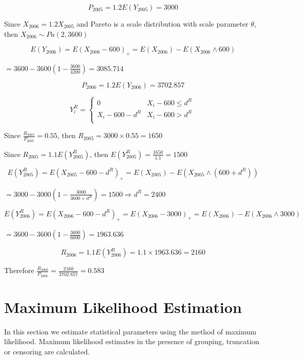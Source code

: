 \documentclass[]{book}
\begin{document}
\[P_{2005} = 1.2E\left( Y_{2005} \right) = 3000\]

Since \(X_{2006} = 1.2X_{2005}\) and Pareto is a scale distribution with
scale parameter \(\theta\), then
\(X_{2006}\sim Pa\left( 2,3600 \right)\)

\[E\left( Y_{2006} \right) = E\left( X_{2006} - 600 \right)_{+} = E\left( X_{2006} \right) - E\left( X_{2006} \land 600 \right)\]

\(= 3600 - 3600\left( 1 - \frac{3600}{4200} \right) = 3085.714\)

\[P_{2006} = 1.2E\left( Y_{2006} \right) = 3702.857\]

\[Y_{i}^{R} = \left\{ \begin{matrix}
0 & X_{i} - 600 \leq d^{R} \\
X_{i} - 600 - d^{R} & X_{i} - 600 > d^{R} \\
\end{matrix} \right.\ \]

Since \(\frac{R_{2005}}{P_{2005}} = 0.55\), then
\(R_{2005} = 3000 \times 0.55 = 1650\)

Since \(R_{2005} = 1.1E\left( Y_{2005}^{R} \right)\), then
\(E\left( Y_{2005}^{R} \right) = \frac{1650}{1.1} = 1500\)

\[E\left( Y_{2005}^{R} \right) = E\left( X_{2005} - 600 - d^{R} \right)_{+} = E\left( X_{2005} \right) - E\left( X_{2005} \land \left( 600 + d^{R} \right) \right)\]

\(= 3000 - 3000\left( 1 - \frac{3000}{3600 + d^{R}} \right) = 1500 \Rightarrow d^{R} = 2400\)

\[E\left( Y_{2006}^{R} \right) = E\left( X_{2006} - 600 - d^{R} \right)_{+} = E\left( X_{2006} - 3000 \right)_{+} = E\left( X_{2006} \right) - E\left( X_{2006} \land 3000 \right)\]

\(= 3600 - 3600\left( 1 - \frac{3600}{6600} \right) = 1963.636\)

\[R_{2006} = 1.1E\left( Y_{2006}^{R} \right) = 1.1 \times 1963.636 = 2160\]

Therefore \(\frac{R_{2006}}{P_{2006}} = \frac{2160}{3702.857} = 0.583\)

\section{Maximum Likelihood
Estimation}\label{maximum-likelihood-estimation}

In this section we estimate statistical parameters using the method of
maximum likelihood. Maximum likelihood estimates in the presence of
grouping, truncation or censoring are calculated.
\end{document}
